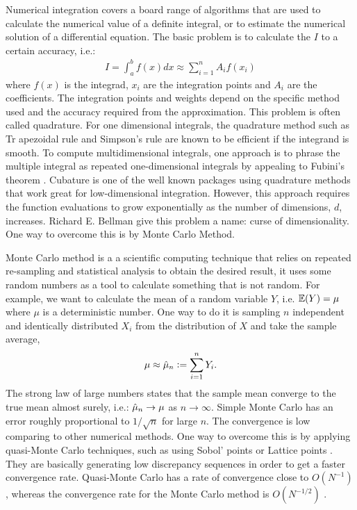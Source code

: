 \documentclass{iitthesis}
\begin{document}
Numerical integration covers a board range of algorithms that are used to calculate the numerical value of a definite integral, or to estimate the numerical solution of a differential equation.
The basic problem is to calculate the $I$ to a certain accuracy, i.e.:
\begin{align}
I = \int_a^b f(x)dx \approx \sum_{i=1}^nA_i f(x_i)
\end{align}
where $f(x)$ is the integrad, $x_i$ are the integration points and $A_i$ are the coefficients. The integration points and weights depend on the specific method used and the accuracy required from the approximation. This problem is often called quadrature. For one dimensional integrals, the quadrature method such as Tr apezoidal rule and Simpson's rule are known to be efficient if the integrand is smooth. To compute multidimensional integrals, one approach is to phrase the multiple integral as repeated one-dimensional integrals by appealing to Fubini's theorem \cite{Fubini1907}. Cubature \cite{cubature} is one of the well known packages using quadrature methods that work great for low-dimensional integration. However, this approach requires the function evaluations to grow exponentially as the number of dimensions, $d$, increases. Richard E. Bellman give this problem a name: curse of dimensionality. One way to overcome this is by Monte Carlo Method.

 Monte Carlo method is a a scientific computing technique that relies on repeated re-sampling and statistical analysis to obtain the desired result, it uses some random numbers as a tool to calculate something that is not random. For example, we want to calculate the mean of a random variable $Y$, i.e. $\mathbb{E}(Y) = \mu$ where $\mu$ is a deterministic number.  One way to do it is sampling $n$ independent and identically distributed $X_i$ from the distribution of $X$ and take the sample average, 
$$\mu \approx \hat{\mu}_n := \sum_{i=1}^nY_i.$$
The strong law of large numbers states that the sample mean converge to the true mean almost surely, i.e.: $\hat{\mu}_n \to \mu$ as $n \to \infty$. Simple Monte Carlo has an error roughly proportional to $1/\sqrt{n}$ for large $n$. The convergence is low comparing to other numerical methods. One way to overcome this is by applying quasi-Monte Carlo techniques, such as using Sobol' points \cite{Sobol67, Sobol76}or Lattice points \cite{Glasserman03}. They are basically generating low discrepancy sequences in order to get a faster convergence rate. Quasi-Monte Carlo has a rate of convergence close to $O(N^{-1})$ \cite{Glasserman03}, whereas the convergence rate for the Monte Carlo method is $O(N^{-1/2})$ \cite{Glasserman03}.
\end{document}
